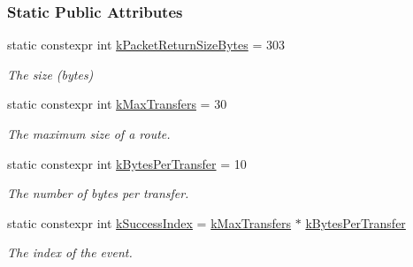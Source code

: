 \subsubsection*{Static Public Attributes}
\begin{DoxyCompactItemize}
\item 
\mbox{\label{classosse_1_1collaborate_1_1_packet_return_ac4c8213599bd47f85d83b85f27e2d24a}} 
static constexpr int \hyperlink{classosse_1_1collaborate_1_1_packet_return_ac4c8213599bd47f85d83b85f27e2d24a}{k\+Packet\+Return\+Size\+Bytes} = 303
\begin{DoxyCompactList}\small\item\em The size (bytes) \end{DoxyCompactList}\item 
\mbox{\label{classosse_1_1collaborate_1_1_packet_return_a5e0eed3ac989888c4cc3ea04aa76ae32}} 
static constexpr int \hyperlink{classosse_1_1collaborate_1_1_packet_return_a5e0eed3ac989888c4cc3ea04aa76ae32}{k\+Max\+Transfers} = 30
\begin{DoxyCompactList}\small\item\em The maximum size of a route. \end{DoxyCompactList}\item 
\mbox{\label{classosse_1_1collaborate_1_1_packet_return_a2672dc70431ab3c8933c6876bb1bdd83}} 
static constexpr int \hyperlink{classosse_1_1collaborate_1_1_packet_return_a2672dc70431ab3c8933c6876bb1bdd83}{k\+Bytes\+Per\+Transfer} = 10
\begin{DoxyCompactList}\small\item\em The number of bytes per transfer. \end{DoxyCompactList}\item 
\mbox{\label{classosse_1_1collaborate_1_1_packet_return_af116129fe59660a284a1dc07c00e25d6}} 
static constexpr int \hyperlink{classosse_1_1collaborate_1_1_packet_return_af116129fe59660a284a1dc07c00e25d6}{k\+Success\+Index} = \hyperlink{classosse_1_1collaborate_1_1_packet_return_a5e0eed3ac989888c4cc3ea04aa76ae32}{k\+Max\+Transfers} $\ast$ \hyperlink{classosse_1_1collaborate_1_1_packet_return_a2672dc70431ab3c8933c6876bb1bdd83}{k\+Bytes\+Per\+Transfer}
\begin{DoxyCompactList}\small\item\em The index of the event. \end{DoxyCompactList}\end{DoxyCompactItemize}
